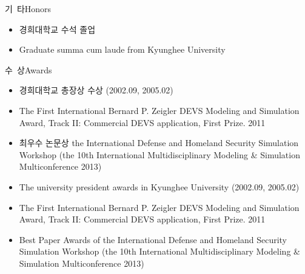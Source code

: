 \documentclass[english,representative]{resume_structure}
\begin{document}
\begin{Others} %

\ResumeSubSection %
    {기\ 타}{Honors}
    {}
    {
      \begin{itemize}
         \item 경희대학교 수석 졸업
      \end{itemize}
    }
    {
      \begin{itemize}
        \item Graduate summa cum laude from Kyunghee University
      \end{itemize}
    }

\ResumeSubSection %
    {수\ 상}{Awards}
    {}
    {
      \begin{itemize}
          \item 경희대학교 총장상 수상 (2002.09, 2005.02) 
          \item The First International Bernard P. Zeigler DEVS Modeling and Simulation Award, Track II: Commercial DEVS application, First Prize. 2011
          \item 최우수 논문상 the International Defense and Homeland Security Simulation Workshop (the 10th International Multidisciplinary Modeling \& Simulation Multiconference 2013) 
      \end{itemize}
    }
    {
      \begin{itemize}
        \item The university president awards in Kyunghee University (2002.09, 2005.02) 
        \item The First International Bernard P. Zeigler DEVS Modeling and Simulation Award, Track II: Commercial DEVS application, First Prize. 2011
        \item Best Paper Awards of the International Defense and Homeland Security Simulation Workshop (the 10th International Multidisciplinary Modeling \& Simulation Multiconference 2013) 
      \end{itemize}
    }


\end{Others}
\end{document}
